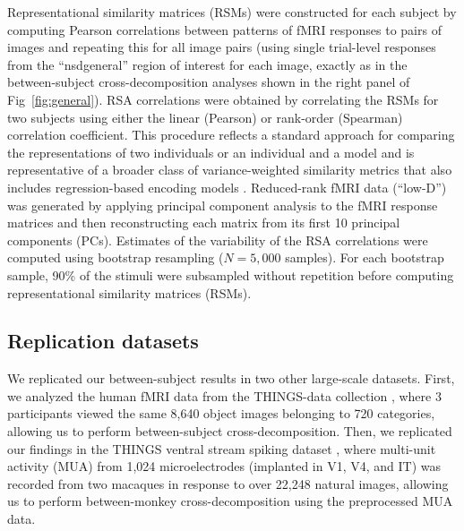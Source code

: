 \documentclass[10pt]{article}
\begin{document}
Representational similarity matrices (RSMs) were constructed for each subject by computing Pearson correlations between patterns of fMRI responses to pairs of images and repeating this for all image pairs (using single trial-level responses from the ``nsdgeneral'' region of interest for each image, exactly as in the between-subject cross-decomposition analyses shown in the right panel of Fig~\ref{fig:general}). RSA correlations were obtained by correlating the RSMs for two subjects using either the linear (Pearson) or rank-order (Spearman) correlation coefficient. This procedure reflects a standard approach for comparing the representations of two individuals or an individual and a model and is representative of a broader class of variance-weighted similarity metrics that also includes regression-based encoding models \autocite{Kriegeskorte2019,Kornblith2019}. Reduced-rank fMRI data (``low-D'') was generated by applying principal component analysis to the fMRI response matrices and then reconstructing each matrix from its first 10 principal components (PCs). Estimates of the variability of the RSA correlations were computed using bootstrap resampling (\(N = 5,000\) samples). For each bootstrap sample, 90\% of the stimuli were subsampled without repetition before computing representational similarity matrices (RSMs).

\subsection{Replication datasets}\label{replication-datasets}

We replicated our between-subject results in two other large-scale datasets. First, we analyzed the human fMRI data from the THINGS-data collection \autocite{Hebart2023}, where 3 participants viewed the same 8,640 object images belonging to 720 categories, allowing us to perform between-subject cross-decomposition. Then, we replicated our findings in the THINGS ventral stream spiking dataset \autocite{Papale2025}, where multi-unit activity (MUA) from 1,024 microelectrodes (implanted in V1, V4, and IT) was recorded from two macaques in response to over 22,248 natural images, allowing us to perform between-monkey cross-decomposition using the preprocessed MUA data.

\newpage
\printbibliography

\newpage
\setcounter{figure}{0}
\renewcommand{\thefigure}{S\arabic{figure} Fig}
\captionsetup[figure]{labelformat=supplementary-figure}
\end{document}
